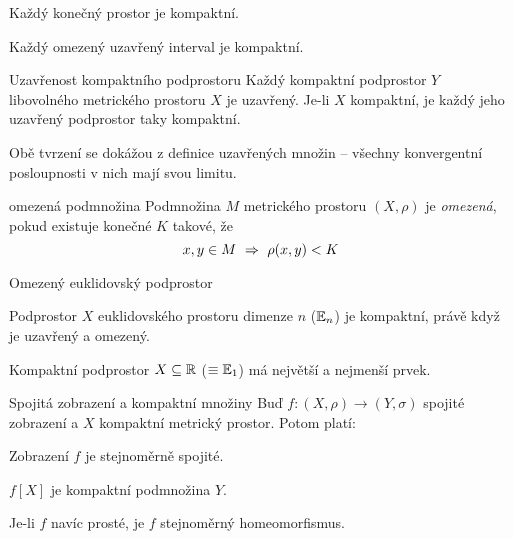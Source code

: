 \begin{priklady}
\begin{pitemize}
    \item Každý konečný prostor je kompaktní.
    \item Každý omezený uzavřený interval je kompaktní.
\end{pitemize}
\end{priklady}

\begin{vetaN}{Uzavřenost kompaktního podprostoru}
Každý kompaktní podprostor $Y$ libovolného metrického prostoru $X$ je uzavřený. Je-li $X$ kompaktní, je každý jeho uzavřený podprostor taky kompaktní.

\begin{dukaz}
Obě tvrzení se dokážou z definice uzavřených množin -- všechny konvergentní posloupnosti v nich mají svou limitu.
\end{dukaz}
\end{vetaN}

\begin{definiceN}{omezená podmnožina}
Podmnožina $M$ metrického prostoru $(X,\rho)$ je \emph{omezená}, pokud existuje konečné $K$ takové, že 
$$x,y\in M\ \Rightarrow\  \rho(x,y)<K$$
\end{definiceN}

\begin{vetaN}{Omezený euklidovský podprostor}
\begin{penumerate}
    \item Podprostor $X$ euklidovského prostoru dimenze $n$ ($\mathbb{E}_n$) je kompaktní, právě když je uzavřený a omezený. 
    \item Kompaktní podprostor $X\subseteq\mathbb{R}$ ($\equiv\mathbb{E}_1$) má největší a nejmenší prvek.
\end{penumerate}
\end{vetaN}

\begin{vetaN}{Spojitá zobrazení a kompaktní množiny}
Buď $f:(X,\rho)\to(Y,\sigma)$ spojité zobrazení a $X$ kompaktní metrický prostor. Potom platí:
\begin{penumerate}
    \item Zobrazení $f$ je stejnoměrně spojité.
    \item $f[X]$ je kompaktní podmnožina $Y$.
    \item Je-li $f$ navíc prosté, je $f$ stejnoměrný homeomorfismus.
\end{penumerate}
\end{vetaN}

